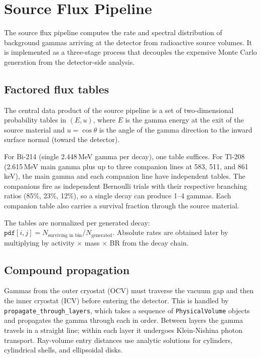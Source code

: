 \documentclass[11pt]{article}
\begin{document}
\section{Source Flux Pipeline}

The source flux pipeline computes the rate and spectral distribution of
background gammas arriving at the detector from radioactive source volumes. It
is implemented as a three-stage process that decouples the expensive Monte Carlo
generation from the detector-side analysis.

\subsection{Factored flux tables}

The central data product of the source pipeline is a set of two-dimensional
probability tables in $(E, u)$, where $E$ is the gamma energy at the exit of the
source material and $u = \cos\theta$ is the angle of the gamma direction to the
inward surface normal (toward the detector).

For Bi-214 (single 2.448\,MeV gamma per decay), one table suffices. For Tl-208
(2.615\,MeV main gamma plus up to three companion lines at 583, 511, and
861\,keV), the main gamma and each companion line have independent tables. The
companions fire as independent Bernoulli trials with their respective branching
ratios (85\%, 23\%, 12\%), so a single decay can produce 1--4 gammas. Each
companion table also carries a survival fraction through the source material.

The tables are normalized per generated decay: $\texttt{pdf}[i,j] =
N_{\text{surviving in bin}}/N_{\text{generated}}$. Absolute rates are obtained
later by multiplying by activity $\times$ mass $\times$ BR from the decay chain.

\subsection{Compound propagation}

Gammas from the outer cryostat (OCV) must traverse the vacuum gap and then the
inner cryostat (ICV) before entering the detector. This is handled by
\texttt{propagate\_through\_layers}, which takes a sequence of
\texttt{PhysicalVolume} objects and propagates the gamma through each in order.
Between layers the gamma travels in a straight line; within each layer it
undergoes Klein-Nishina photon transport. Ray-volume entry distances use
analytic solutions for cylinders, cylindrical shells, and ellipsoidal disks.
\end{document}
